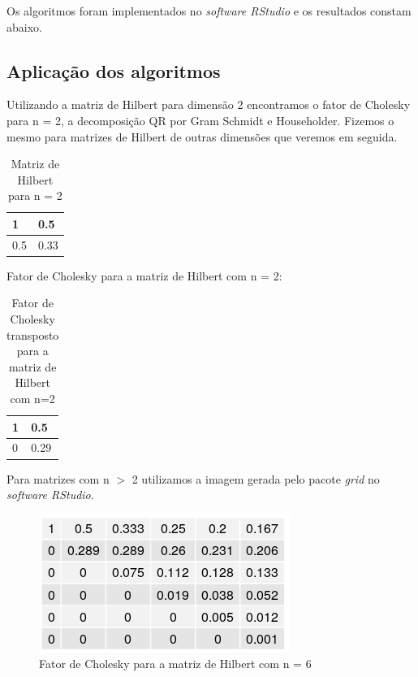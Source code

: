 \documentclass[12pt, a4paper]{article}
\begin{document}
Os algoritmos foram implementados no \textit{software RStudio} e os resultados constam abaixo.

%
\subsection{Aplicação dos algoritmos}
Utilizando a matriz de Hilbert para dimensão 2 encontramos o fator de Cholesky para n = 2, a decomposição QR por Gram Schmidt e Householder. Fizemos o mesmo para matrizes de Hilbert de outras dimensões que veremos em seguida.

\begin{table}[!htbp]
\caption{Matriz de Hilbert para n = 2}
\centering
\begin{tabular}{|l|l|}
\hline
1   & 0.5  \\
\hline
0.5 & 0.33\\
\hline
\end{tabular}
\end{table}

Fator de Cholesky para a matriz de Hilbert com n = 2:
\begin{table}[!htbp]
\caption{Fator de Cholesky transposto para a matriz de Hilbert com n=2}
\centering
\begin{tabular}{|l|l|}
\hline
1 & 0.5  \\
\hline
0 & 0.29\\
\hline
\end{tabular}
\end{table}

Para matrizes com n $>$ 2 utilizamos a imagem gerada pelo pacote \textit{grid} no \textit{software RStudio}.
\begin{figure}[!htbp]
    \centering
    \includegraphics[]{matrizes/matriz_hilbert_CH6.png}
    \caption{Fator de Cholesky para a matriz de Hilbert com n = 6}
    \label{fig:my_label}
\end{figure}
\end{document}
